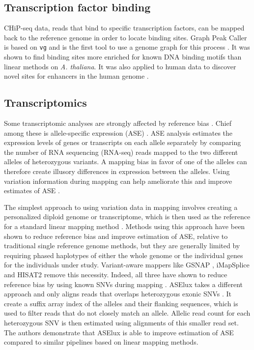 \subsection{Transcription factor binding}

CHiP-seq data, reads that bind to specific transcription factors, can be mapped back to the reference genome in order to locate binding sites.
Graph Peak Caller is based on \texttt{vg} and is the first tool to use a genome graph for this process \cite{Grytten_2019}.
It was shown to find binding sites more enriched for known DNA binding motifs than linear methods on \emph{A. thaliana}.
It was also applied to human data to discover novel sites for enhancers in the human genome \cite{groza2019personalized}. 


\subsection{Transcriptomics}

Some transcriptomic analyses are strongly affected by reference bias \cite{Degner2009-vw,stevenson2013sources}.
Chief among these is allele-specific expression (ASE) \cite{Castel2015-ef}.
ASE analysis estimates the expression levels of genes or transcripts on each allele separately by comparing the number of RNA sequencing (RNA-seq) reads mapped to the two different alleles of heterozygous variants.
A mapping bias in favor of one of the alleles can therefore create illusory differences in expression between the alleles.
Using variation information during mapping can help ameliorate this and improve estimates of ASE \cite{Castel2015-ef,Miao2018-ps}.

The simplest approach to using variation data in mapping involves creating a personalized diploid genome or transcriptome, which is then used as the reference for a standard linear mapping method \cite{Turro2011-op,Rozowsky_2011,Bray_2016,Raghupathy2018-sd}.
Methods using this approach have been shown to reduce reference bias and improve estimation of ASE, relative to traditional single reference genome methods, but they are generally limited by requiring phased haplotypes of either the whole genome or the individual genes for the individuals under study.
Variant-aware mappers like GSNAP \cite{Wu2010-hv}, iMapSplice \cite{Liu_2018} and HISAT2 \cite{Kim_2019} remove this necessity.
Indeed, all three have shown to reduce reference bias by using known SNVs during mapping \cite{Castel2015-ef,Liu_2018}.
ASElux takes a different approach and only aligns reads that overlaps heterozygous exonic SNVs \cite{Miao2018-ps}.
It create a suffix array index of the alleles and their flanking sequences, which is used to filter reads that do not closely match an allele.
Allelic read count for each heterozygous SNV is then estimated using alignments of this smaller read set.
The authors demonstrate that ASElux is able to improve estimation of ASE compared to similar pipelines based on linear mapping methods.

